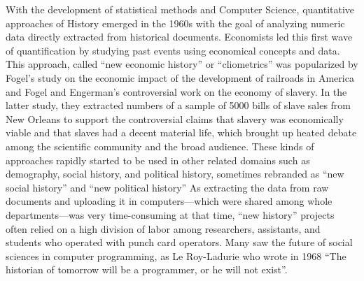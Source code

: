 With the development of statistical methods and Computer Science, quantitative approaches of History emerged in the 1960s with the goal of analyzing numeric data directly extracted from historical documents.
Economists led this first wave of quantification by studying past events using economical concepts and data.
This approach, called ``new economic history'' or ``cliometrics'' was popularized by Fogel's study on the economic impact of the development of railroads in America\cite{fogelRailroadsAmericanEconomic1964} and Fogel and Engerman's controversial work on the economy of slavery\cite{fogel1974time}.
In the latter study, they extracted numbers of a sample of 5000 bills of slave sales from New Orleans to support the controversial claims that slavery was economically viable and that slaves had a decent material life, which brought up heated debate among the scientific community and the broad audience\cite{whaplesWhereThereConsensus1995}.
These kinds of approaches rapidly started to be used in other related domains such as demography, social history, and political history, sometimes rebranded as ``new social history'' and ``new political history''\cite{lemercierBackSourcesPracticing2021}
As extracting the data from raw documents and uploading it in computers---which were shared among whole departments---was very time-consuming at that time, ``new history'' projects often relied on a high division of labor among researchers, assistants, and students who operated with punch card operators\cite{landesHistorySocialScience1971}.
Many saw the future of social sciences in computer programming, as Le Roy-Ladurie who wrote in 1968 ``The historian of tomorrow will be a programmer, or he will not exist''\cite{lemercierQuantitativeMethodsHumanities2019}.

